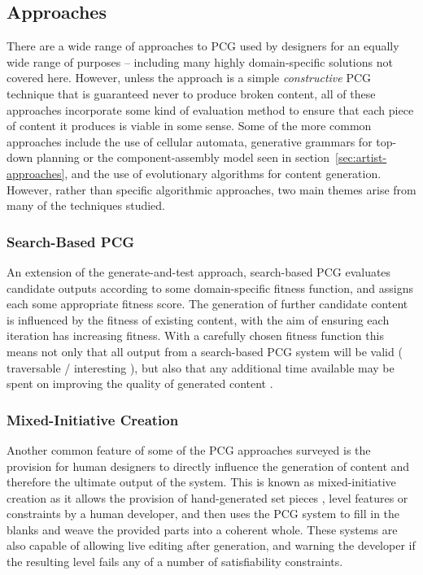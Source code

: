 \documentclass{acm_proc_article-sp}
\begin{document}
\subsection{Approaches}
There are a wide range of approaches to PCG used by designers for an equally wide range of purposes -- including many highly domain-specific solutions not covered here. However, unless the approach is a simple \textit{constructive} PCG technique that is guaranteed never to produce broken content, all of these approaches incorporate some kind of evaluation method to ensure that each piece of content it produces is viable in some sense. Some of the more common approaches include the use of cellular automata, generative grammars for top-down planning or the component-assembly model seen in section~\ref{sec:artist-approaches}, and the use of evolutionary algorithms for content generation.
However, rather than specific algorithmic approaches, two main themes arise from many of the techniques studied.

\subsubsection{Search-Based PCG}
An extension of the generate-and-test approach, search-based PCG evaluates candidate outputs according to some domain-specific fitness function, and assigns each some appropriate fitness score. The generation of further candidate content is influenced by the fitness of existing content, with the aim of ensuring each iteration has increasing fitness. With a carefully chosen fitness function this means not only that all output from a search-based PCG system will be valid ( traversable / interesting ), but also that any additional time available may be spent on improving the quality of generated content \cite{togelius2011search}.

\subsubsection{Mixed-Initiative Creation}
Another common feature of some of the PCG approaches surveyed is the provision for human designers to directly influence the generation of content and therefore the ultimate output of the system. This is known as mixed-initiative creation as it allows the provision of hand-generated set pieces \cite{smith2010tanagra}, level features \cite{mawhorter2010procedural} or constraints \cite{smelik2011semantic} by a human developer, and then uses the PCG system to fill in the blanks and weave the provided parts into a coherent whole. These systems are also capable of allowing live editing after generation, and warning the developer if the resulting level fails any of a number of satisfiability constraints.
\end{document}
